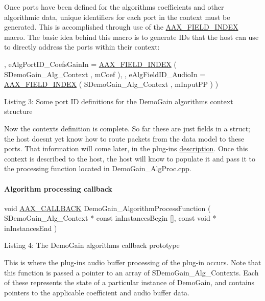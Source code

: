 Once ports have been defined for the algorithm\textquotesingle{}s coefficients and other algorithmic data, unique identifiers for each port in the context must be generated. This is accomplished through use of the \hyperlink{a00149_acf807247ecd6e5899dc9dc31644e9a1d}{A\+A\+X\+\_\+\+F\+I\+E\+L\+D\+\_\+\+I\+N\+D\+E\+X} macro. The basic idea behind this macro is to generate I\+Ds that the host can use to directly address the ports within their context\+:


\begin{DoxyCode}
, eAlgPortID\_CoefsGainIn = \hyperlink{a00149_acf807247ecd6e5899dc9dc31644e9a1d}{AAX\_FIELD\_INDEX} ( SDemoGain\_Alg\_Context , mCoef ),
, eAlgFieldID\_AudioIn = \hyperlink{a00149_acf807247ecd6e5899dc9dc31644e9a1d}{AAX\_FIELD\_INDEX} ( SDemoGain\_Alg\_Context , mInputPP ) ) 
\end{DoxyCode}
  Listing 3\+: Some port I\+D definitions for the Demo\+Gain algorithm\textquotesingle{}s context structure

Now the context\textquotesingle{}s definition is complete. So far these are just fields in a struct; the host doesn\textquotesingle{}t yet know how to route packets from the data model to these ports. That information will come later, in the plug-\/in\textquotesingle{}s \hyperlink{a00324_subsection__describe_connect_the_parameter_throughout_the_plug-in}{description}. Once this context is described to the host, the host will know to populate it and pass it to the processing function located in Demo\+Gain\+\_\+\+Alg\+Proc.\+cpp.

\hypertarget{a00324_subsubsection__algorithm_processing_callback_}{}\paragraph{Algorithm processing callback}\label{a00324_subsubsection__algorithm_processing_callback_}



\begin{DoxyCode}
\textcolor{keywordtype}{void}
\hyperlink{a00149_aaa22112139aa627574b1ef562f579d43}{AAX\_CALLBACK}
DemoGain\_AlgorithmProcessFunction (
    SDemoGain\_Alg\_Context * \textcolor{keyword}{const} inInstancesBegin [],
    \textcolor{keyword}{const} \textcolor{keywordtype}{void} * inInstancesEnd ) 
\end{DoxyCode}
  Listing 4\+: The Demo\+Gain algorithm\textquotesingle{}s callback prototype

This is where the plug-\/in\textquotesingle{}s audio buffer processing of the plug-\/in occurs. Note that this function is passed a pointer to an array of {\ttfamily S\+Demo\+Gain\+\_\+\+Alg\+\_\+\+Contexts}. Each of these represents the state of a particular instance of Demo\+Gain, and contains pointers to the applicable coefficient and audio buffer data.

